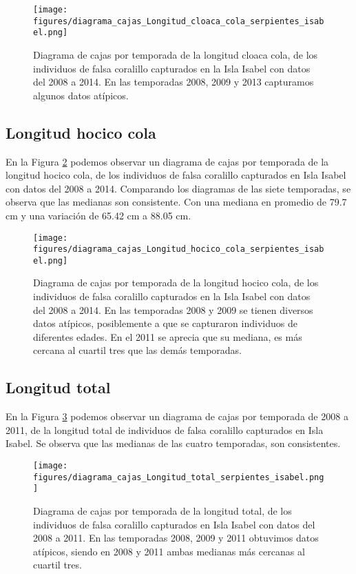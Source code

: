 \documentclass{article}
\begin{document}
\begin{figure}[H]
\centering
\texttt{[image: figures/diagrama\_cajas\_Longitud\_cloaca\_cola\_serpientes\_isabel.png]}
\caption{Diagrama de cajas por temporada de la longitud cloaca cola, de los individuos de falsa coralillo capturados en la Isla Isabel con datos del 2008 a 2014. En las temporadas 2008, 2009 y 2013 capturamos algunos datos atípicos.}
\label{fig:pngBoxsplotLongitudCloacaCola}
\end{figure}

\subsection*{Longitud hocico cola}
En la Figura \ref{fig:pngBoxsplotLongitudHocicoCola} podemos observar un diagrama de cajas por
temporada de la longitud hocico cola, de los individuos de falsa coralillo capturados en Isla
Isabel con datos del 2008 a 2014. Comparando los diagramas de las siete temporadas, se observa  que
las medianas son consistente. Con una mediana en promedio de 79.7 cm y una variación de 65.42 cm a
88.05 cm. 

\begin{figure}[H]
\centering
\texttt{[image: figures/diagrama\_cajas\_Longitud\_hocico\_cola\_serpientes\_isabel.png]}
\caption{Diagrama de cajas por temporada de la longitud hocico cola, de los individuos de falsa coralillo capturados en la Isla Isabel con datos del 2008 a 2014. En las temporadas 2008 y 2009 se tienen diversos datos atípicos, posiblemente a que se capturaron individuos de diferentes edades. En el 2011 se aprecia que su mediana, es más cercana al cuartil tres que las demás temporadas.}
\label{fig:pngBoxsplotLongitudHocicoCola}
\end{figure}

\subsection*{Longitud total}
En la Figura \ref{fig:pngBoxsplotLongitudTotal} podemos observar un diagrama de cajas por temporada de 2008 a 2011, de la longitud total de individuos de falsa coralillo capturados en Isla Isabel. Se observa que las medianas de las cuatro temporadas, son consistentes.  

\begin{figure}[H]
\centering
\texttt{[image: figures/diagrama\_cajas\_Longitud\_total\_serpientes\_isabel.png]}
\caption{Diagrama de cajas por temporada de la longitud total, de los individuos de falsa coralillo capturados en Isla Isabel con datos del 2008 a 2011. En las temporadas 2008, 2009 y 2011 obtuvimos datos atípicos, siendo en 2008 y 2011 ambas medianas más cercanas al cuartil tres.}
\label{fig:pngBoxsplotLongitudTotal}
\end{figure}
\end{document}
